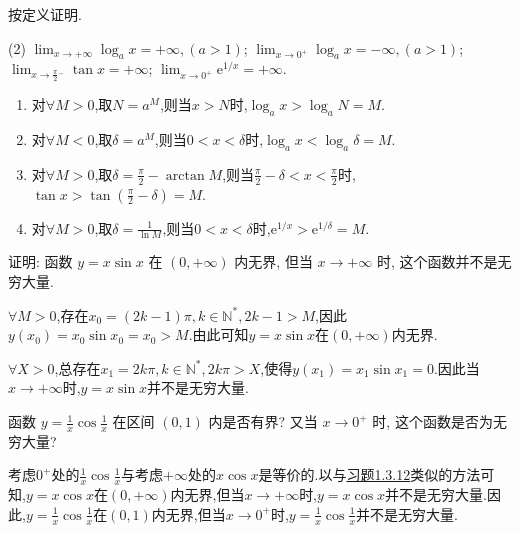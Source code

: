 \begin{exercise}[1.3.11]
    按定义证明.
    \begin{tasks}[label=(\arabic*)](2)
        \task $\lim_{x \to +\infty} \log_a x = +\infty, (a > 1)$;
        \task $\lim_{x \to 0^+} \log_a x = -\infty, (a > 1)$;
        \task $\lim_{x \to \frac{\pi}{2}{}^- }\tan x = +\infty$;
        \task $\lim_{x \to 0^+} \mathrm{e}^{1/x} = +\infty$.
    \end{tasks}
\end{exercise}

\begin{solution}
    \begin{enumerate}[(1)]
        \item 对$\forall M > 0$,取$N = a^M$,则当$x > N$时,$\log_a x > \log_a N = M$.
        \item 对$\forall M < 0$,取$\delta = a^M$,则当$0 < x < \delta$时,$\log_a x < \log_a \delta = M$.
        \item 对$\forall M > 0$,取$\delta = \frac{\pi}{2} - \arctan M$,则当$\frac{\pi}{2} - \delta < x < \frac{\pi}{2}$时,$\tan x > \tan(\frac{\pi}{2} - \delta) = M$.
        \item 对$\forall M > 0$,取$\delta = \frac{1}{\ln M}$,则当$0 < x < \delta$时,$\mathrm{e}^{1/x} > \mathrm{e}^{1/\delta} = M$.
    \end{enumerate}
\end{solution}

\begin{exercise}[1.3.12]\label{exe:1.3.12}
    证明: 函数 $y=x\sin x$ 在 $(0, +\infty)$ 内无界, 但当 $x \to +\infty$ 时, 这个函数并不是无穷大量.
\end{exercise}

\begin{solution}
    $\forall M > 0$,存在$x_0 = (2k-1) \pi, k \in \mathbb{N}^*, 2k - 1 > M$,因此$y(x_0) = x_0 \sin x_0 = x_0 > M$.由此可知$y = x \sin x$在$(0, +\infty)$内无界.

    $\forall X > 0$,总存在$x_1 = 2k \pi, k \in \mathbb{N}^*, 2k \pi > X$,使得$y(x_1) = x_1 \sin x_1 = 0$.因此当$x \to +\infty$时,$y = x \sin x$并不是无穷大量.
\end{solution}

\begin{exercise}[1.3.13]
    函数 $y = \frac{1}{x}\cos\frac{1}{x}$ 在区间 $(0,1)$ 内是否有界? 又当 $x \to 0^+$ 时, 这个函数是否为无穷大量?
\end{exercise}

\begin{solution}
    考虑$0^+$处的$\frac{1}{x} \cos \frac{1}{x}$与考虑$+\infty$处的$x \cos x$是等价的.以与\hyperref[exe:1.3.12]{习题1.3.12}类似的方法可知,$y = x \cos x$在$(0, +\infty)$内无界,但当$x \to +\infty$时,$y = x \cos x$并不是无穷大量.因此,$y = \frac{1}{x} \cos \frac{1}{x}$在$(0, 1)$内无界,但当$x \to 0^+$时,$y = \frac{1}{x} \cos \frac{1}{x}$并不是无穷大量.
\end{solution}

